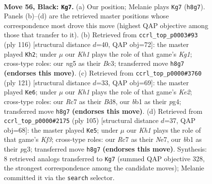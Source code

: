\documentclass[11pt]{article}
\begin{document}
\clearpage

\begin{figure}[p]\centering
\begin{subfigure}{0.46\textwidth}\centering
\resizebox{\linewidth}{!}{%
\newchessgame
\chessboard[
  setfen={7k/2r2p1p/b5p1/4P1N1/1n3Pp1/8/6KP/1B6 b - - 3 56},
  showmover=false,
  pgfstyle=straightmove, color=movearrow, markmove={h8-g7}
]}
\caption{}
\end{subfigure}\hfill
\begin{subfigure}{0.46\textwidth}\centering
\resizebox{\linewidth}{!}{%
\newchessgame
\chessboard[
  setfen={8/1b3k2/5p2/1p5N/p1n4p/P1B4P/1P4P1/6K1 w - - 4 59},
  showmover=false,
  pgfstyle=straightmove, color=movearrow, markmove={g1-h2}
]}
\caption{}
\end{subfigure}
\\[4pt]
\begin{subfigure}{0.46\textwidth}\centering
\resizebox{\linewidth}{!}{%
\newchessgame
\chessboard[
  setfen={3b4/4k3/8/4p1p1/1p1pPpP1/1P1P1N2/5K2/8 b - - 17 61},
  showmover=false,
  pgfstyle=straightmove, color=movearrow, markmove={e7-e6}
]}
\caption{}
\end{subfigure}\hfill
\begin{subfigure}{0.46\textwidth}\centering
\resizebox{\linewidth}{!}{%
\newchessgame
\chessboard[
  setfen={8/4n3/p1p2k2/1pP2p2/1P1N4/P3K1P1/8/8 b - - 2 53},
  showmover=false,
  pgfstyle=straightmove, color=movearrow, markmove={f6-e5}
]}
\caption{}
\end{subfigure}
\caption{\textbf{Move 56, Black: \texttt{Kg7}.} (a) Our position; Melanie plays \texttt{Kg7} (\texttt{h8g7}). Panels (b)--(d) are the retrieved master positions whose correspondence most drove this move (highest QAP objective among those that transfer to it). (b) Retrieved from \texttt{ccrl\_top\_p0003\#93} (ply 116) [structural distance $d$=40, QAP obj=72]: the master played \texttt{Kh2}; under $\mu$ our \emph{Kh1} plays the role of that game's \emph{Kg1}; cross-type roles: our \emph{n}g5 as their \emph{B}c3; transferred move \texttt{h8g7} \textbf{(endorses this move)}. (c) Retrieved from \texttt{ccrl\_top\_p0000\#3760} (ply 121) [structural distance $d$=33, QAP obj=69]: the master played \texttt{Ke6}; under $\mu$ our \emph{Kh1} plays the role of that game's \emph{Ke2}; cross-type roles: our \emph{R}c7 as their \emph{B}d8, our \emph{b}b1 as their \emph{p}g4; transferred move \texttt{h8g7} \textbf{(endorses this move)}. (d) Retrieved from \texttt{ccrl\_top\_p0000\#2175} (ply 105) [structural distance $d$=37, QAP obj=68]: the master played \texttt{Ke5}; under $\mu$ our \emph{Kh1} plays the role of that game's \emph{Kf3}; cross-type roles: our \emph{R}c7 as their \emph{N}e7, our \emph{b}b1 as their \emph{p}g3; transferred move \texttt{h8g7} \textbf{(endorses this move)}. Synthesis: 8 retrieved analogs transferred to \texttt{Kg7} (summed QAP objective 328, the strongest correspondence among the candidate moves); Melanie committed it via the \texttt{search} selector.}
\label{fig:thought-m111}
\end{figure}
\end{document}
